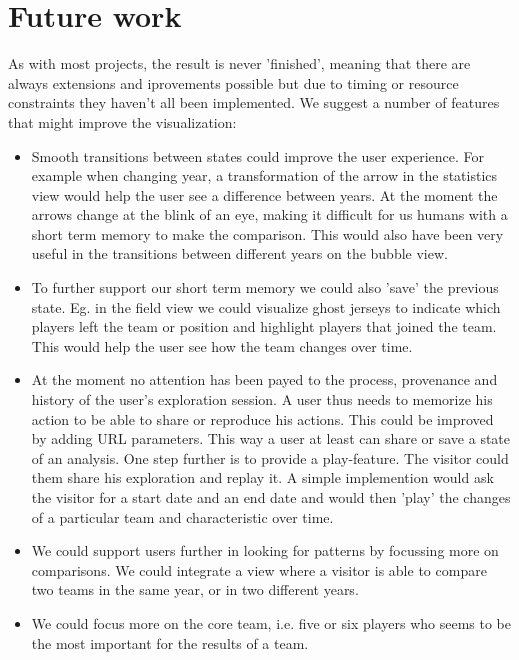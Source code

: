 \documentclass[]{sigchi}
\begin{document}
\section{Future work}\label{sec:futurework}
As with most projects, the result is never 'finished', meaning that there are
always extensions and iprovements possible but due to timing or resource constraints they haven't all been implemented. We suggest a number of features that might improve the visualization:
\begin{itemize}
    \item Smooth transitions between states could improve the user experience.
        For example when changing year, a transformation of the arrow in the
        statistics view would help the user see a difference between years.  At
        the moment the arrows change at the blink of an eye, making it difficult
        for us humans with a short term memory to make the comparison. This
        would also have been very useful in the transitions between different
        years on the bubble view.
    \item To further support our short term memory we could also 'save' the
        previous state. Eg. in the field view we could visualize ghost jerseys
        to indicate which players left the team or position and highlight
        players that joined the team.  This would help the user see how the team
        changes over time.
    \item At the moment no attention has been payed to the process, provenance
        and history of the user's exploration session. A user thus needs to
        memorize his action to be able to share or reproduce his actions. This
        could be improved by adding URL parameters. This way a user at least can
        share or save a state of an analysis. One step further is to provide a
        play-feature. The visitor could them share his exploration and replay
        it. A simple implemention would ask the visitor for a start date and an
        end date and would then 'play' the changes of a particular team and
        characteristic over time.
    \item We could support users further in looking for patterns by focussing
        more on comparisons. We could integrate a view where a visitor is able
        to compare two teams in the same year, or in two different years.
    \item We could focus more on the core team, i.e. five or six players who seems 
        to be the most important for the results of a team.
\end{itemize}
\end{document}
